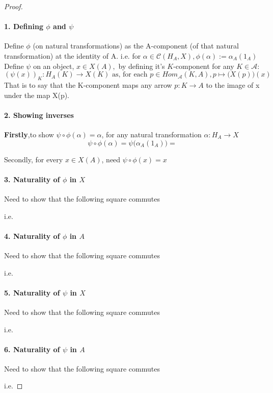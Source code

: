 \documentclass[18pt,a4paper]{extarticle}
\theoremstyle{definition}
\theoremstyle{definition}
\begin{document}
\begin{proof}
	\paragraph{1. Defining $\phi$ and $\psi$}
	Define $\phi$ (on natural transformations) as the A-component (of that natural transformation)
	at the identity of A. i.e. for $\alpha \in \mathcal{C}(H_A,X) ,
	\phi(\alpha):= \alpha_A(1_A) $ \\

	Define $\psi$ on an object, $ x \in X(A), $ by defining it's $K$-component for any $K \in \mathcal{A} $:
	\[({\psi(x)})_K : H_A(K) \to X(K)
	\text{ as, for each } p\in Hom_{\mathcal{A} }(K,A), p \mapsto \Big(X(p)\Big)(x) \]
	That is to say that the K-component maps any arrow $p:K \to A$ to the image of x under the map X(p).

	\paragraph {2. Showing inverses} \textbf{Firstly},to show $\psi \circ \phi (\alpha) = \alpha $,
	for any natural transformation $\alpha: H_A \to X$\\

	\[ \psi \circ \phi (\alpha) = \psi \Big(\alpha_A(1_A) \Big) =  \]

	Secondly, for every $x \in X(A)$, need $\psi \circ \phi (x) = x$

	\paragraph{3. Naturality of $\phi$ in $X$}
	Need to show that the following square commutes

	i.e.
	\paragraph{4. Naturality of $\phi$ in $A$}
	Need to show that the following square commutes

	i.e.
	\paragraph{5. Naturality of $\psi$ in $X$}
	Need to show that the following square commutes

	i.e.
	\paragraph{6. Naturality of $\psi$ in $A$}
	Need to show that the following square commutes

	i.e.

\end{proof}
\end{document}
